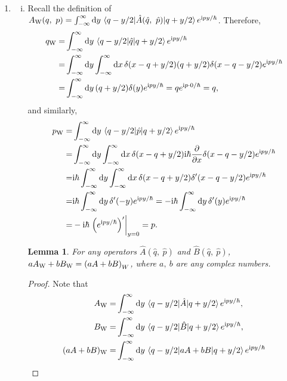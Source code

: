\documentclass{article}
\newtheorem{lemma}[theorem]{Lemma}
\newcommand{\iu}{\ensuremath{\mathrm{i}}}
\begin{document}
\begin{enumerate}[1.]
  \item
  \begin{enumerate}[(i)]
    \item Recall the definition of $A_\mathrm{W}(q,\ p) = \int_{-\infty}^{\infty}\dd{y}\mel{q-y/2}{\hat{A}(\hat{q},\ \hat{p})}{q + y/2} e^{\iu p y / \hbar}$. Therefore, 
    \begin{align*}
      q_\mathrm{W} =& \int_{-\infty}^{\infty}\dd{y}\mel{q-y/2}{\hat{q}}{q + y/2} e^{\iu p y / \hbar}
      \\
      =& \int_{-\infty}^{\infty}\dd{y} \int_{-\infty}^{\infty} \dd{x} \delta(x - q + y/2) (q+y/2) \delta(x - q - y/2) e^{\iu p y / \hbar} \\
      =& \int_{-\infty}^{\infty}\dd{y} (q+y/2)\delta(y) e^{\iu p y / \hbar}
      = qe^{\iu p \cdot 0 / \hbar} = q,
    \end{align*}
    and similarly,
    \begin{align*}
      p_\mathrm{W} =& \int_{-\infty}^{\infty}\dd{y}\mel{q-y/2}{\hat{p}}{q + y/2} e^{\iu p y / \hbar}
      \\
      =& \int_{-\infty}^{\infty}\dd{y} \int_{-\infty}^{\infty} \dd{x} \delta(x - q + y/2) \iu\hbar\pdv{x} \delta(x - q - y/2) e^{\iu p y / \hbar} \\
      =& \iu\hbar\int_{-\infty}^{\infty}\dd{y} \int_{-\infty}^{\infty} \dd{x} \delta(x - q + y/2) \delta'(x - q - y/2) e^{\iu p y / \hbar}\\
      =& \iu\hbar\int_{-\infty}^{\infty}\dd{y}\delta'(- y)  e^{\iu p y / \hbar} 
      = -\iu\hbar\int_{-\infty}^{\infty}\dd{y}\delta'(y)  e^{\iu p y / \hbar} \\
      =& -\iu\hbar\eval{\qty(e^{\iu p y / \hbar})'}_{y = 0} = p.
    \end{align*}
    \begin{lemma}
      For any operators $\hat{A}(\hat{q},\ \hat{p})$ and $\hat{B}(\hat{q},\ \hat{p})$, $aA_\mathrm{W} + bB_\mathrm{W} = \qty(a{A} + b{B})_W$, where $a,\ b$ are any complex numbers.
    \end{lemma}
    \begin{proof}
      Note that
      \begin{align*}
        A_\mathrm{W} =& \int_{-\infty}^{\infty}\dd{y}\mel{q-y/2}{\hat{A}}{q + y/2} e^{\iu p y / \hbar},
        \\
        B_\mathrm{W} =& \int_{-\infty}^{\infty}\dd{y}\mel{q-y/2}{\hat{B}}{q + y/2} e^{\iu p y / \hbar},
        \\
        (aA+bB)_\mathrm{W} =& \int_{-\infty}^{\infty}\dd{y}\mel{q-y/2}{{aA+bB}}{q + y/2} e^{\iu p y / \hbar}\\

\end{align*}
\end{proof}
\end{enumerate}
\end{enumerate}
\end{document}
